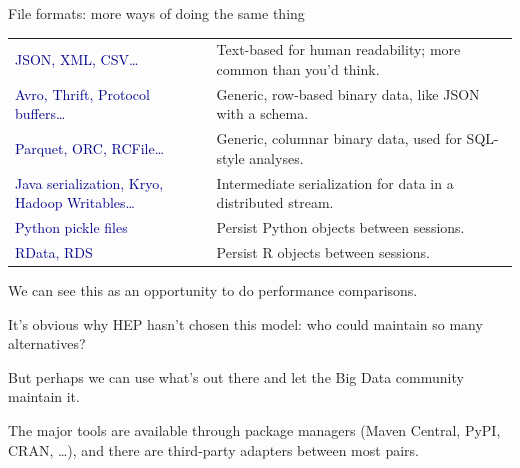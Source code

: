 \documentclass{beamer}
\begin{document}
\begin{frame}{File formats: more ways of doing the same thing}

\vfill
\hspace{-0.4 cm}\begin{minipage}{\linewidth}
\renewcommand{\arraystretch}{1.5}
\begin{tabular}{p{0.4\linewidth} p{0.6\linewidth}}
\textcolor{darkblue}{JSON, XML, CSV\ldots} & Text-based for human readability; more common than you'd think. \\
\raggedright \textcolor{darkblue}{Avro, Thrift, Protocol buffers\ldots} & Generic, row-based binary data, like JSON with a schema. \\
\textcolor{darkblue}{Parquet, ORC, RCFile\ldots} & Generic, columnar binary data, used for SQL-style analyses. \\
\raggedright \textcolor{darkblue}{Java serialization, Kryo, Hadoop Writables\ldots} & Intermediate serialization for data in a distributed stream. \\
\textcolor{darkblue}{Python pickle files} & Persist Python objects between sessions. \\
\textcolor{darkblue}{RData, RDS} & Persist R objects between sessions. \\
\end{tabular}
\end{minipage}

\vfill
We can see this as an opportunity to do performance comparisons.

\vfill
\end{frame}

\begin{frame}{}
\begin{center}
\begin{minipage}{0.8\linewidth}
It's obvious why HEP hasn't chosen this model: who could maintain so many alternatives?

\vspace{1.5 cm}
But perhaps we can use what's out there and let the Big Data community maintain it.

\vspace{1.5 cm}
The major tools are available through package managers (Maven Central, PyPI, CRAN, \ldots), and there are third-party adapters between most pairs.
\end{minipage}
\end{center}
\end{frame}
\end{document}
